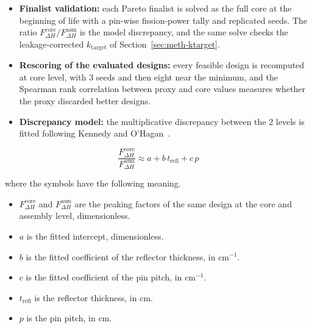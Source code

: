 \begin{itemize}
  \item \textbf{Finalist validation:} each Pareto finalist is solved as
        the full core at the beginning of life with a pin-wise fission-power
        tally and replicated seeds. The ratio
        $F_{\Delta H}^\mathrm{core}/F_{\Delta H}^\mathrm{asm}$ is the
        model discrepancy, and the same solve checks the leakage-corrected $k_\mathrm{target}$ of Section~\ref{sec:meth-ktarget}.

  \item \textbf{Rescoring of the evaluated designs:} every feasible design is recomputed
        at core level, with 3 seeds and then eight near the minimum,
        and the Spearman rank correlation between proxy and core values
        measures whether the proxy discarded better designs.

  \item \textbf{Discrepancy model:} the multiplicative discrepancy
        between the 2 levels is fitted following Kennedy and
        O'Hagan~\cite{kennedy_ohagan_2000,forrester_book_2008}.
\end{itemize}

\begin{equation}
\frac{F_{\Delta H}^\mathrm{core}}{F_{\Delta H}^\mathrm{asm}}
\approx a + b\,t_\mathrm{refl} + c\,p
\label{eq:bridge}
\end{equation}

\noindent where the symbols have the following meaning.

\begin{itemize}
  \item $F_{\Delta H}^\mathrm{core}$ and $F_{\Delta H}^\mathrm{asm}$
        are the peaking factors of the same design at the core and assembly
        level, dimensionless.

  \item $a$ is the fitted intercept, dimensionless.

  \item $b$ is the fitted coefficient of the reflector thickness, in
        cm$^{-1}$.

  \item $c$ is the fitted coefficient of the pin pitch, in cm$^{-1}$.

  \item $t_\mathrm{refl}$ is the reflector thickness, in cm.

  \item $p$ is the pin pitch, in cm.
\end{itemize}

